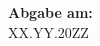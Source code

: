 \begin{center}




\vspace{1.4cm}

\hspace*{-1.0cm} \textbf{Abgabe am:} \\
\hspace*{-1.0cm} XX.YY.20ZZ \\

\end{center}










